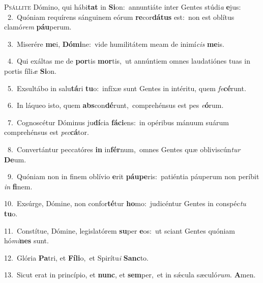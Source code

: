 \lettrine{\initial\textcolor{\initialcolor}{P}}{sállite} Dómino, qui hábi\textbf{tat} in \textbf{Si}\-on:~\star annuntiáte inter Gentes stúdi\textit{a} \textbf{e}\-jus:\\
{\numbfont\textcolor{\numbcolor}{~2.}}~Quóniam requírens sánguinem eórum \textbf{re}\-cor\-\textbf{dá}\-\textbf{tus} est:~\star non est oblítus clamó\textit{rem} \textbf{páu}\-perum.\par
{\numbfont\textcolor{\numbcolor}{~3.}}~Miserére \textbf{me}\-i, \textbf{Dó}\-\textbf{mi}ne:~\star vide humilitátem meam de inimí\textit{cis} \textbf{me}\-is.\par
{\numbfont\textcolor{\numbcolor}{~4.}}~Qui exáltas me de \textbf{por}\-tis \textbf{mor}\-tis,~\star ut annúntiem omnes laudatiónes tuas in portis fíli\textit{æ} \textbf{Si}\-on.\par
{\numbfont\textcolor{\numbcolor}{~5.}}~Exsultábo in salu\-\textbf{tá}\-ri \textbf{tu}\-o:~\star infíxæ sunt Gentes in intéritu, quem \textit{fe}\-\textbf{cé}runt.\par
{\numbfont\textcolor{\numbcolor}{~6.}}~In láqueo isto, quem \textbf{abs}\-con\-\textbf{dé}\-runt,~\star comprehénsus est pes \textit{e}\-\textbf{ó}rum.\par
{\numbfont\textcolor{\numbcolor}{~7.}}~Cognoscétur Dóminus ju\-\textbf{dí}\-cia \textbf{fá}\-\textbf{ci}ens:~\star in opéribus mánuum suárum comprehénsus est \textit{pec}\-\textbf{cá}tor.\par
{\numbfont\textcolor{\numbcolor}{~8.}}~Convertántur peccatóres \textbf{in} in\-\textbf{fér}\-num,~\star omnes Gentes quæ obliviscún\textit{tur} \textbf{De}\-um.\par
{\numbfont\textcolor{\numbcolor}{~9.}}~Quóniam non in finem oblívio \textbf{e}\-rit \textbf{páu}\-\textbf{pe}ris:~\star patiéntia páuperum non períbit \textit{in} \textbf{fi}\-nem.\par
{\numbfont\textcolor{\numbcolor}{10.}}~Exsúrge, Dómine, non confor\-\textbf{té}\-tur \textbf{ho}\-mo:~\star judicéntur Gentes in conspéc\textit{tu} \textbf{tu}\-o.\par
{\numbfont\textcolor{\numbcolor}{11.}}~Constítue, Dómine, legislatórem \textbf{su}\-per \textbf{e}\-os:~\star ut sciant Gentes quóniam hó\-\textit{mi}\-\textbf{nes} sunt.\par
{\numbfont\textcolor{\numbcolor}{12.}}~Glória \textbf{Pa}\-tri, et \textbf{Fí}\-\textbf{li}o,~\star et Spirítu\textit{i} \textbf{Sanc}\-to.\par
{\numbfont\textcolor{\numbcolor}{13.}}~Sicut erat in princípio, et \textbf{nunc}\-, et \textbf{sem}\-per,~\star et in sǽcula sæculó\-\textit{rum}\-. \textbf{A}\-men.\par
